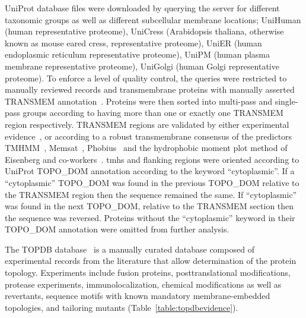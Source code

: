 UniProt database files were downloaded by querying the server for different taxonomic groups as well as different subcellular membrane locations; UniHuman (human representative proteome), UniCress (Arabidopsis thaliana, otherwise known as mouse eared cress, representative proteome), UniER (human endoplasmic reticulum representative proteome), UniPM (human plasma membrane representative proteome), UniGolgi (human Golgi representative proteome).
To enforce a level of quality control, the queries were restricted to manually reviewed records and transmembrane proteins with manually asserted TRANSMEM annotation~\cite{TheUniProtConsortium2014}.
Proteins were then sorted into multi\--pass and single\--pass groups according to having more than one or exactly one TRANSMEM region respectively.
TRANSMEM regions are validated by either experimental evidence~\cite{TheUniProtConsortium2014}, or according to a robust transmembrane consensus of the predictors TMHMM~\cite{Krogh2001}, Memsat~\cite{Jones2007}, Phobius~\cite{Kall2004,Kall2007} and the hydrophobic moment plot method of Eisenberg and co-workers~\cite{Eisenberg1984}.
\gls{tmh}s and flanking regions were oriented according to UniProt TOPO\_DOM annotation according to the keyword ``cytoplasmic''.
If a ``cytoplasmic'' TOPO\_DOM was found in the previous TOPO\_DOM relative to the TRANSMEM region then the sequence remained the same.
If ``cytoplasmic'' was found in the next TOPO\_DOM, relative to the TRANSMEM section then the sequence was reversed.
Proteins without the ``cytoplasmic'' keyword in their TOPO\_DOM annotation were omitted from further analysis.

The TOPDB database~\cite{Dobson2015} is a manually curated database composed of experimental records from the literature that allow determination of the protein topology.
Experiments include fusion proteins, posttranslational modifications, protease experiments, immunolocalization, chemical modifications as well as revertants, sequence motifs with known mandatory membrane-embedded topologies, and tailoring mutants (Table~\ref{table:topdbevidence}).

